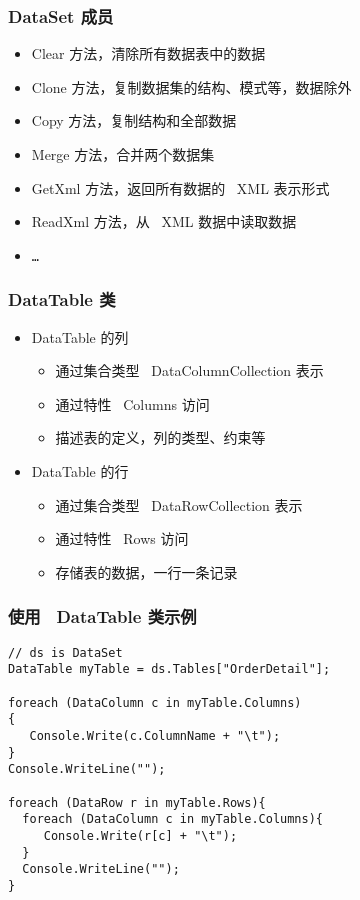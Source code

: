 \begin{frame}
\frametitle{DataSet 成员}
\begin{itemize}
\setlength{\itemsep}{8pt plus 1pt}
\item Clear 方法，清除所有数据表中的数据
\item Clone 方法，复制数据集的结构、模式等，数据除外
\item Copy 方法，复制结构和全部数据
\item Merge 方法，合并两个数据集
\item GetXml 方法，返回所有数据的 ~XML 表示形式
\item ReadXml 方法，从 ~XML 数据中读取数据
\item \texttt{\dots}
\end{itemize}
\end{frame}

\begin{frame}
\frametitle{DataTable 类}
\begin{itemize}
\setlength{\itemsep}{8pt plus 1pt}
\item DataTable 的列
\begin{itemize}
\setlength{\itemsep}{4pt plus 1pt}
\item 通过集合类型 ~DataColumnCollection 表示
\item 通过特性 ~Columns 访问
\item 描述表的定义，列的类型、约束等
\end{itemize}
\item DataTable 的行
\begin{itemize}
\setlength{\itemsep}{4pt plus 1pt}
\item 通过集合类型 ~DataRowCollection 表示
\item 通过特性 ~Rows 访问
\item 存储表的数据，一行一条记录
\end{itemize}
\end{itemize}
\end{frame}

\begin{frame}[fragile]
\frametitle{使用 ~DataTable 类示例}
\begin{lstlisting}
// ds is DataSet
DataTable myTable = ds.Tables["OrderDetail"];

foreach (DataColumn c in myTable.Columns)
{
   Console.Write(c.ColumnName + "\t");
}
Console.WriteLine("");

foreach (DataRow r in myTable.Rows){
  foreach (DataColumn c in myTable.Columns){
     Console.Write(r[c] + "\t");
  }
  Console.WriteLine("");
}

\end{lstlisting}
\end{frame}

